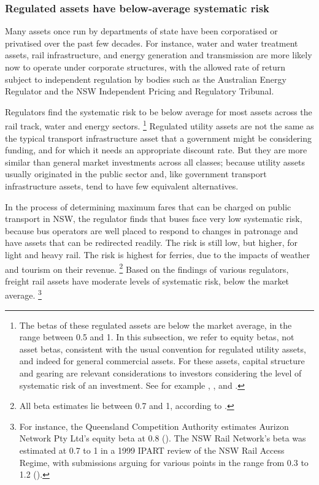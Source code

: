 \documentclass{grattan}
\begin{document}
\subsubsection{Regulated assets have below-average systematic risk}
Many assets once run by departments of state have been corporatised or privatised over the past few decades. For instance, water and water treatment assets, rail infrastructure, and energy generation and transmission are more likely now to operate under corporate structures, with the allowed rate of return subject to independent regulation by bodies such as the Australian Energy Regulator and the NSW Independent Pricing and Regulatory Tribunal.
 
Regulators find the systematic risk to be below average for most assets across the rail track, water and energy sectors.%
    \footnote{The betas of these regulated assets are below the market average, in the range between 0.5 and 1. In this subsection, we refer to equity betas, not asset betas, consistent with the usual convention for regulated utility assets, and indeed for general commercial assets. For these assets, capital structure and gearing are relevant considerations to investors considering the level of systematic risk of an investment. See for example \textcite{AER-Rate-of-return}, \textcite{IPART-2015-WACC-information-paper}, and \textcite{QCA-risk-free-rate-and-MRP}.} 
Regulated utility assets are not the same as the typical transport infrastructure asset that a government might be considering funding, and for which it needs an appropriate discount rate. But they are more similar than general market investments across all classes; because utility assets usually originated in the public sector and, like government transport infrastructure assets, tend to have few equivalent  alternatives.

In the process of determining maximum fares that can be charged on public transport in NSW, the regulator finds that buses face very low systematic risk, because bus operators are well placed to respond to changes in patronage and have assets that can be redirected readily. The risk is still low, but higher, for light and heavy rail. The risk is highest for ferries, due to the impacts of weather and tourism on their revenue.%
    \footnote{All beta estimates lie between 0.7 and 1, according to \textcite[][4]{IPART-2015-WACC-information-paper}.}
Based on the findings of various regulators, freight rail assets have moderate levels of systematic risk, below the market average.%
    \footnote{For instance, the Queensland Competition Authority estimates Aurizon Network Pty Ltd’s equity beta at 0.8 (\textcite{Frontier-Consulting-2016-equity-beta}). The NSW Rail Network’s beta was estimated at 0.7 to 1 in a 1999 IPART review of the NSW Rail Access Regime, with submissions arguing for various points in the range from 0.3 to 1.2 (\textcite{IPART-1999-Aspects-of-the-NSW-Rail-Access-Regime}).}
\end{document}
